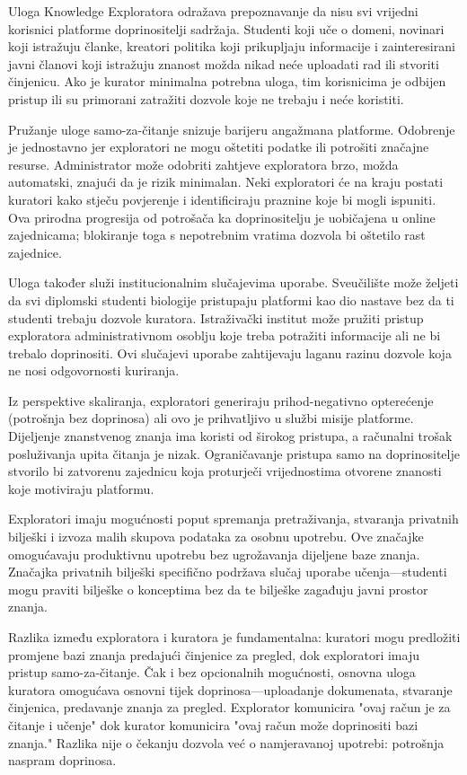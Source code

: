 \documentclass[12pt,a4paper]{article}
\begin{document}
Uloga Knowledge Exploratora odražava prepoznavanje da nisu svi vrijedni korisnici platforme doprinositelji sadržaja. Studenti koji uče o domeni, novinari koji istražuju članke, kreatori politika koji prikupljaju informacije i zainteresirani javni članovi koji istražuju znanost možda nikad neće uploadati rad ili stvoriti činjenicu. Ako je kurator minimalna potrebna uloga, tim korisnicima je odbijen pristup ili su primorani zatražiti dozvole koje ne trebaju i neće koristiti.

Pružanje uloge samo-za-čitanje snizuje barijeru angažmana platforme. Odobrenje je jednostavno jer exploratori ne mogu oštetiti podatke ili potrošiti značajne resurse. Administrator može odobriti zahtjeve exploratora brzo, možda automatski, znajući da je rizik minimalan. Neki exploratori će na kraju postati kuratori kako stječu povjerenje i identificiraju praznine koje bi mogli ispuniti. Ova prirodna progresija od potrošača ka doprinositelju je uobičajena u online zajednicama; blokiranje toga s nepotrebnim vratima dozvola bi oštetilo rast zajednice.

Uloga također služi institucionalnim slučajevima uporabe. Sveučilište može željeti da svi diplomski studenti biologije pristupaju platformi kao dio nastave bez da ti studenti trebaju dozvole kuratora. Istraživački institut može pružiti pristup exploratora administrativnom osoblju koje treba potražiti informacije ali ne bi trebalo doprinositi. Ovi slučajevi uporabe zahtijevaju laganu razinu dozvole koja ne nosi odgovornosti kuriranja.

Iz perspektive skaliranja, exploratori generiraju prihod-negativno opterećenje (potrošnja bez doprinosa) ali ovo je prihvatljivo u službi misije platforme. Dijeljenje znanstvenog znanja ima koristi od širokog pristupa, a računalni trošak posluživanja upita čitanja je nizak. Ograničavanje pristupa samo na doprinositelje stvorilo bi zatvorenu zajednicu koja proturječi vrijednostima otvorene znanosti koje motiviraju platformu.

Exploratori imaju mogućnosti poput spremanja pretraživanja, stvaranja privatnih bilješki i izvoza malih skupova podataka za osobnu upotrebu. Ove značajke omogućavaju produktivnu upotrebu bez ugrožavanja dijeljene baze znanja. Značajka privatnih bilješki specifično podržava slučaj uporabe učenja—studenti mogu praviti bilješke o konceptima bez da te bilješke zagađuju javni prostor znanja.

Razlika između exploratora i kuratora je fundamentalna: kuratori mogu predložiti promjene bazi znanja predajući činjenice za pregled, dok exploratori imaju pristup samo-za-čitanje. Čak i bez opcionalnih mogućnosti, osnovna uloga kuratora omogućava osnovni tijek doprinosa—uploadanje dokumenata, stvaranje činjenica, predavanje znanja za pregled. Explorator komunicira "ovaj račun je za čitanje i učenje" dok kurator komunicira "ovaj račun može doprinositi bazi znanja." Razlika nije o čekanju dozvola već o namjeravanoj upotrebi: potrošnja naspram doprinosa.
\end{document}
